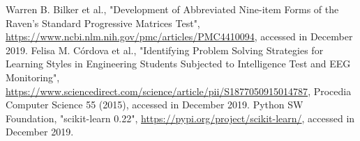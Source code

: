 \documentclass[extendedabs]{recpad2k}
\begin{document}



\begin{thebibliography}{00}
 Warren B. Bilker et al., "Development of Abbreviated Nine-item Forms of the Raven’s Standard Progressive Matrices Test", \url{https://www.ncbi.nlm.nih.gov/pmc/articles/PMC4410094}, accessed in December 2019.
 Felisa M. Córdova et al., "Identifying Problem Solving Strategies for Learning Styles in Engineering Students Subjected to Intelligence Test and EEG Monitoring", \url{https://www.sciencedirect.com/science/article/pii/S1877050915014787}, Procedia Computer Science 55 (2015), accessed in December 2019.
 Python SW Foundation, "scikit-learn 0.22", \url{https://pypi.org/project/scikit-learn/}, accessed in December 2019.

\end{thebibliography}

% 
\end{document}
